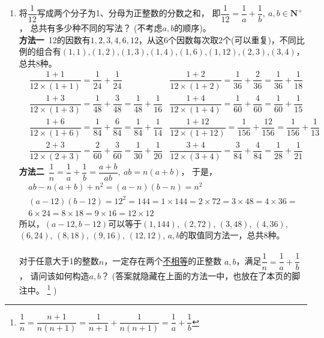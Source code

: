 \begin{enumerate}[label={【\textbf{例\thechapter.\arabic*}】},
 leftmargin=\inteval{\myenumleftmargin}pt,
 itemsep=\inteval{\myenumitempsep}pt,
 itemindent=\inteval{\myenumitemindent}pt]
\item 将$ \dfrac{1}{12} $写成两个分子为1、分母为正整数的分数之和，
即$ \dfrac{1}{12}=\dfrac{1}{a}+\dfrac{1}{b},\ a,b\in\textbf{N}^+ $，
总共有多少种不同的写法？
(不考虑$ a,b $的顺序)。\\
\textbf{方法一}\ 12的因数有$ 1,2,3,4,6,12 $，从这6个因数每次取2个(可以重复)，不同比例的组合有$ (1,1) $,$ (1,2) $,$ (1,3) $,$ (1,4) $,$ (1,6) $,$ (1,12) $,$ (2,3) $,$ (3,4) $，总共8种。
\begin{align*}
    & \dfrac{1+1}{12\times(1+1)}=\dfrac{1}{24}+\dfrac{1}{24} 
    & \dfrac{1+2}{12\times(1+2)}=\dfrac{1}{36}+\dfrac{2}{36}=\dfrac{1}{36}+\dfrac{1}{18}\\
    & \dfrac{1+3}{12\times(1+3)}=\dfrac{1}{48}+\dfrac{3}{48}=\dfrac{1}{48}+\dfrac{1}{16} 
    & \dfrac{1+4}{12\times(1+4)}=\dfrac{1}{60}+\dfrac{4}{60}=\dfrac{1}{60}+\dfrac{1}{15} \\
    & \dfrac{1+6}{12\times(1+6)}=\dfrac{1}{84}+\dfrac{6}{84}=\dfrac{1}{84}+\dfrac{1}{14} 
    & \dfrac{1+12}{12\times(1+12)}=\dfrac{1}{156}+\dfrac{12}{156}=
    \dfrac{1}{156}+\dfrac{1}{13} \\
    & \dfrac{2+3}{12\times(2+3)}=\dfrac{2}{60}+\dfrac{3}{60}=\dfrac{1}{30}+\dfrac{1}{20} 
    & \dfrac{3+4}{12\times(3+4)}=\dfrac{3}{84}+\dfrac{4}{84}=\dfrac{1}{28}+\dfrac{1}{21} 
\end{align*}
\textbf{方法二}\ $ \dfrac{1}{n}=\dfrac{1}{a}+\dfrac{1}{b}=\dfrac{a+b}{ab},\ ab=n(a+b) $，
于是，
\begin{gather*}
    ab-n(a+b)+n^2=(a-n)(b-n)=n^2 \\
    (a-12)(b-12)=12^2=144=1\times144=2\times72=3\times48=4\times36=\\
    6\times24= 8\times18=9\times16=12\times12
\end{gather*}
所以，$ (a-12,b-12) $可以等于$ (1,144)$, $(2,72)$, $(3,48)$, $(4,36)$, $(6,24)$, 
$(8,18)$, $(9,16) $, $(12,12)$, $ a,b $的取值同方法一，总共8种。\\
\\
对于任意大于1的整数$ n $，一定存在两个\underline{不相等}的正整数
$ a,b $，满足$ \dfrac{1}{n}=\dfrac{1}{a}+\dfrac{1}{b} $，
请问该如何构造$ a,b $？
(答案就隐藏在上面的方法一中，也放在了本页的脚注中。
\footnote{$ \dfrac{1}{n}=\dfrac{n+1}{n(n+1)}=
   \dfrac{1}{n+1}+\dfrac{1}{n(n+1)}=\dfrac{1}{a}+\dfrac{1}{b}$} )


\end{enumerate}
